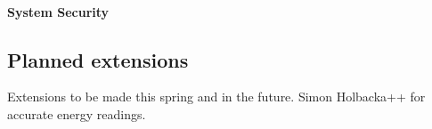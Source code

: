 \paragraph*{System Security}

\subsection{Planned extensions}
Extensions to be made this spring and in the future.
Simon Holbacka++ for accurate energy readings.
